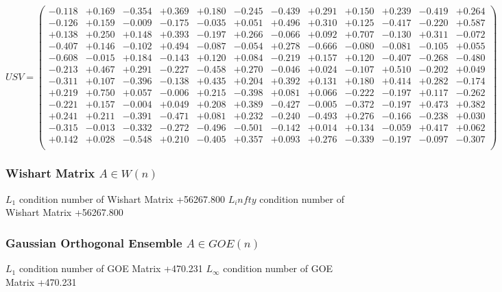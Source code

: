 \documentclass[9pt]{article}
\theoremstyle{plain}
\theoremstyle{definition}
\theoremstyle{remark}
\numberwithin{equation}{section}
\begin{document}
$U S V = \left(
\begin{array}{
cccccccccccc}
-0.118 & +0.169 & -0.354 & +0.369 & +0.180 & -0.245 & -0.439 & +0.291 & +0.150 & +0.239 & -0.419 & +0.264 \\
-0.126 & +0.159 & -0.009 & -0.175 & -0.035 & +0.051 & +0.496 & +0.310 & +0.125 & -0.417 & -0.220 & +0.587 \\
+0.138 & +0.250 & +0.148 & +0.393 & -0.197 & +0.266 & -0.066 & +0.092 & +0.707 & -0.130 & +0.311 & -0.072 \\
-0.407 & +0.146 & -0.102 & +0.494 & -0.087 & -0.054 & +0.278 & -0.666 & -0.080 & -0.081 & -0.105 & +0.055 \\
-0.608 & -0.015 & +0.184 & -0.143 & +0.120 & +0.084 & -0.219 & +0.157 & +0.120 & -0.407 & -0.268 & -0.480 \\
-0.213 & +0.467 & +0.291 & -0.227 & -0.458 & +0.270 & -0.046 & +0.024 & -0.107 & +0.510 & -0.202 & +0.049 \\
-0.311 & +0.107 & -0.396 & -0.138 & +0.435 & +0.204 & +0.392 & +0.131 & +0.180 & +0.414 & +0.282 & -0.174 \\
+0.219 & +0.750 & +0.057 & -0.006 & +0.215 & -0.398 & +0.081 & +0.066 & -0.222 & -0.197 & +0.117 & -0.262 \\
-0.221 & +0.157 & -0.004 & +0.049 & +0.208 & +0.389 & -0.427 & -0.005 & -0.372 & -0.197 & +0.473 & +0.382 \\
+0.241 & +0.211 & -0.391 & -0.471 & +0.081 & +0.232 & -0.240 & -0.493 & +0.276 & -0.166 & -0.238 & +0.030 \\
-0.315 & -0.013 & -0.332 & -0.272 & -0.496 & -0.501 & -0.142 & +0.014 & +0.134 & -0.059 & +0.417 & +0.062 \\
+0.142 & +0.028 & -0.548 & +0.210 & -0.405 & +0.357 & +0.093 & +0.276 & -0.339 & -0.197 & -0.097 & -0.307 \\
\end{array}
\right)$ \newline 

\subsubsection{Wishart Matrix $A \in W(n)$}
$L_1$ condition number of Wishart Matrix +56267.800
$L_infty$ condition number of Wishart Matrix +56267.800
\subsubsection{Gaussian Orthogonal Ensemble $A \in GOE(n)$}
$L_1$ condition number of GOE Matrix +470.231
$L_\infty$ condition number of GOE Matrix +470.231
\end{document}
